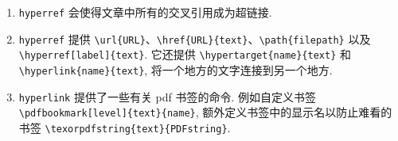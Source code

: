 \documentclass[UTF8,no-math]{ctexart}
\renewcommand{\figureautorefname}{图}
\numberwithin{enumi}{section}
\begin{document}
\begin{enumerate}
\begin{enumerate}
\begin{itemize}
                \item \texttt{hyperref} 定义: \verb|\autoref|, 自动为引用的数字添加前缀. 这个前缀由 \verb|\某autorefname| 定义, 默认已定义为英文. 修改方法: \verb|\renewcommand{\figureautorefname}{图}|. 
                \item \texttt{nameref} 定义: \verb|\nameref|, 获得被引对象的标题. 
                \par \emph{\autoref{tab:1} 是. }
            \end{itemize}
        \item \texttt{hyperref} 会使得文章中所有的交叉引用成为超链接. 
        \item \texttt{hyperref} 提供 \verb|\url{URL}|、\verb|\href{URL}{text}|、\verb|\path{filepath}| 以及 \verb|\hyperref[label]{text}|. 它还提供 \verb|\hypertarget{name}{text}| 和 \verb|\hyperlink{name}{text}|, 将一个地方的文字连接到另一个地方. 
        \item \texttt{hyperlink} 提供了一些有关 pdf 书签的命令. 例如自定义书签 \verb|\pdfbookmark[level]{text}{name}|, 额外定义书签中的显示名以防止难看的书签 \verb|\texorpdfstring{text}{PDFstring}|.
        \end{enumerate}
    \end{enumerate}
\end{document}
